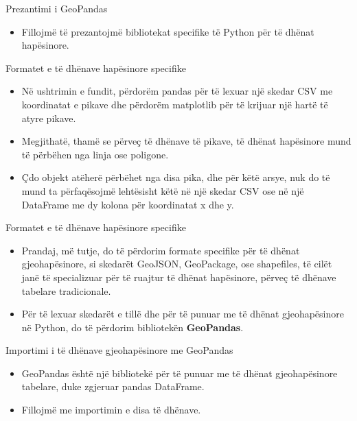 \documentclass[
  ignorenonframetext,
]{beamer}
\providecommand{\tightlist}{%
  \setlength{\itemsep}{0pt}\setlength{\parskip}{0pt}}
\begin{document}
\begin{frame}{Prezantimi i GeoPandas}
\protect\hypertarget{prezantimi-i-geopandas}{}
\begin{itemize}
\tightlist
\item
  Fillojmë të prezantojmë bibliotekat specifike të Python për të dhënat
  hapësinore.
\end{itemize}
\end{frame}

\begin{frame}{Formatet e të dhënave hapësinore specifike}
\protect\hypertarget{formatet-e-tuxeb-dhuxebnave-hapuxebsinore-specifike}{}
\begin{itemize}
\item
  Në ushtrimin e fundit, përdorëm pandas për të lexuar një skedar CSV me
  koordinatat e pikave dhe përdorëm matplotlib për të krijuar një hartë
  të atyre pikave.
\item
  Megjithatë, thamë se përveç të dhënave të pikave, të dhënat hapësinore
  mund të përbëhen nga linja ose poligone.
\item
  Çdo objekt atëherë përbëhet nga disa pika, dhe për këtë arsye, nuk do
  të mund ta përfaqësojmë lehtësisht këtë në një skedar CSV ose në një
  DataFrame me dy kolona për koordinatat x dhe y.
\end{itemize}
\end{frame}

\begin{frame}{Formatet e të dhënave hapësinore specifike}
\protect\hypertarget{formatet-e-tuxeb-dhuxebnave-hapuxebsinore-specifike-1}{}
\begin{itemize}
\item
  Prandaj, më tutje, do të përdorim formate specifike për të dhënat
  gjeohapësinore, si skedarët GeoJSON, GeoPackage, ose shapefiles, të
  cilët janë të specializuar për të ruajtur të dhënat hapësinore, përveç
  të dhënave tabelare tradicionale.
\item
  Për të lexuar skedarët e tillë dhe për të punuar me të dhënat
  gjeohapësinore në Python, do të përdorim bibliotekën
  \textbf{GeoPandas}.
\end{itemize}
\end{frame}

\begin{frame}{Importimi i të dhënave gjeohapësinore me GeoPandas}
\protect\hypertarget{importimi-i-tuxeb-dhuxebnave-gjeohapuxebsinore-me-geopandas}{}
\begin{itemize}
\item
  GeoPandas është një bibliotekë për të punuar me të dhënat
  gjeohapësinore tabelare, duke zgjeruar pandas DataFrame.
\item
  Fillojmë me importimin e disa të dhënave.
\end{itemize}
\end{frame}
\end{document}
